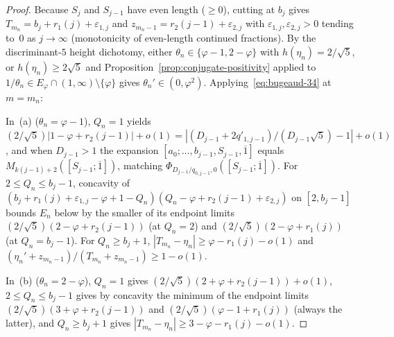 \documentclass[11pt]{amsart}
\theoremstyle{definition}
\theoremstyle{remark}
\numberwithin{equation}{section}
\begin{document}
\begin{proof}
Because $S_j$ and $S_{j-1}$ have even length ($\ge0$), cutting at $b_j$ gives
$T_{m_n}=b_j+r_1(j)+\varepsilon_{1,j}$ and
$z_{m_n-1}=r_2(j-1)+\varepsilon_{2,j}$ with $\varepsilon_{1,j},\varepsilon_{2,j}>0$
tending to~$0$ as $j\to\infty$ (monotonicity of even-length continued fractions).
By the discriminant-$5$ height dichotomy, either
$\theta_n\in\{\varphi-1,2-\varphi\}$ with $h(\eta_n)=2/\sqrt5$, or
$h(\eta_n)\ge2\sqrt5$ and Proposition~\ref{prop:conjugate-positivity} applied
to $1/\theta_n\in E_\varphi\cap(1,\infty)\setminus\{\varphi\}$ gives
$\theta_n'\in(0,\varphi^2)$. Applying~\eqref{eq:bugeaud-34} at $m=m_n$:

In~(a) ($\theta_n=\varphi-1$), $Q_n=1$ yields
$(2/\sqrt5)|1-\varphi+r_2(j-1)|+o(1)=|(D_{j-1}+2q'_{1,j-1})/(D_{j-1}\sqrt5)-1|+o(1)$,
and when $D_{j-1}>1$ the expansion $[a_0;\ldots,b_{j-1},S_{j-1},\overline1]$
equals $M_{k(j-1)+2}([S_{j-1};\overline1])$, matching
$\Phi_{D_{j-1}/q_{0,j-1},0}([S_{j-1};\overline1])$. For $2\le Q_n\le b_j-1$,
concavity of $(b_j+r_1(j)+\varepsilon_{1,j}-\varphi+1-Q_n)(Q_n-\varphi+r_2(j-1)+\varepsilon_{2,j})$
on $[2,b_j-1]$ bounds $E_n$ below by the smaller of its endpoint limits
$(2/\sqrt5)(2-\varphi+r_2(j-1))$ (at $Q_n=2$) and
$(2/\sqrt5)(2-\varphi+r_1(j))$ (at $Q_n=b_j-1$). For $Q_n\ge b_j+1$,
$|T_{m_n}-\eta_n|\ge\varphi-r_1(j)-o(1)$ and $(\eta_n'+z_{m_n-1})/(T_{m_n}+z_{m_n-1})\ge1-o(1)$.

In~(b) ($\theta_n=2-\varphi$), $Q_n=1$ gives $(2/\sqrt5)(2+\varphi+r_2(j-1))+o(1)$,
$2\le Q_n\le b_j-1$ gives by concavity the minimum of the endpoint limits
$(2/\sqrt5)(3+\varphi+r_2(j-1))$ and $(2/\sqrt5)(\varphi-1+r_1(j))$ (always the latter),
and $Q_n\ge b_j+1$ gives $|T_{m_n}-\eta_n|\ge3-\varphi-r_1(j)-o(1)$.


\end{proof}
\end{document}
